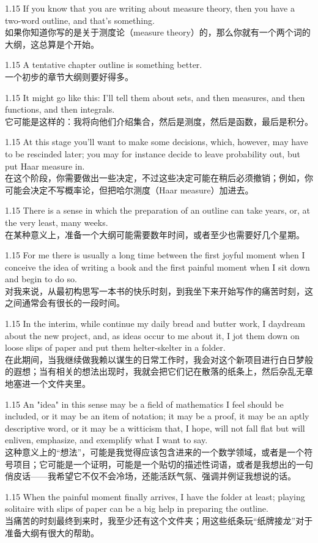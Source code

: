 \documentclass[12pt,a4paper]{article}
\newcommand{\bilingual}[2]{
    \begin{spacing}{1.15} %
        \noindent \normalsize #1 \\[-0.5ex] %
        \small \textcolor{blue!70!black}{#2} %
    \end{spacing}
    \vspace{0.8em} %
}
\begin{document}
\bilingual{If you know that you are writing about measure theory, then you have a two-word outline, and that's something.}
{如果你知道你写的是关于测度论（measure theory）的，那么你就有一个两个词的大纲，这总算是个开始。} %

\bilingual{A tentative chapter outline is something better.}
{一个初步的章节大纲则要好得多。} %

\bilingual{It might go like this: I'll tell them about sets, and then measures, and then functions, and then integrals.}
{它可能是这样的：我将向他们介绍集合，然后是测度，然后是函数，最后是积分。} %

\bilingual{At this stage you'll want to make some decisions, which, however, may have to be rescinded later; you may for instance decide to leave probability out, but put Haar measure in.}
{在这个阶段，你需要做出一些决定，不过这些决定可能在稍后必须撤销；例如，你可能会决定不写概率论，但把哈尔测度（Haar measure）加进去。} %

\bilingual{There is a sense in which the preparation of an outline can take years, or, at the very least, many weeks.}
{在某种意义上，准备一个大纲可能需要数年时间，或者至少也需要好几个星期。} %

\bilingual{For me there is usually a long time between the first joyful moment when I conceive the idea of writing a book and the first painful moment when I sit down and begin to do so.}
{对我来说，从最初构思写一本书的快乐时刻，到我坐下来开始写作的痛苦时刻，这之间通常会有很长的一段时间。} %

\bilingual{In the interim, while continue my daily bread and butter work, I daydream about the new project, and, as ideas occur to me about it, I jot them down on loose slips of paper and put them helter-skelter in a folder.}
{在此期间，当我继续做我赖以谋生的日常工作时，我会对这个新项目进行白日梦般的遐想；当有相关的想法出现时，我就会把它们记在散落的纸条上，然后杂乱无章地塞进一个文件夹里。} %

\bilingual{An "idea" in this sense may be a field of mathematics I feel should be included, or it may be an item of notation; it may be a proof, it may be an aptly descriptive word, or it may be a witticism that, I hope, will not fall flat but will enliven, emphasize, and exemplify what I want to say.}
{这种意义上的“想法”，可能是我觉得应该包含进来的一个数学领域，或者是一个符号项目；它可能是一个证明，可能是一个贴切的描述性词语，或者是我想出的一句俏皮话——我希望它不仅不会冷场，还能活跃气氛、强调并例证我想说的话。} %

\bilingual{When the painful moment finally arrives, I have the folder at least; playing solitaire with slips of paper can be a big help in preparing the outline.}
{当痛苦的时刻最终到来时，我至少还有这个文件夹；用这些纸条玩“纸牌接龙”对于准备大纲有很大的帮助。} %
\end{document}
